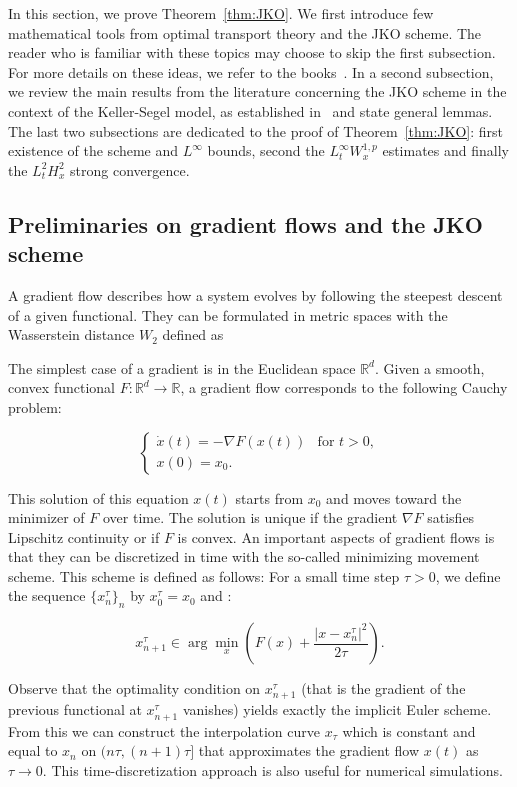 \documentclass[a4paper,twosided, 11pt]{article}
\theoremstyle{plain}
\theoremstyle{remark}
\numberwithin{equation}{section}
\begin{document}
In this section, we prove Theorem~\ref{thm:JKO}. We first introduce few mathematical tools from optimal transport theory and the JKO scheme. The reader who is familiar with these topics may choose to skip the first subsection. For more details on these ideas, we refer to the books~\cite{santambrogio2015optimal,villani2021topics,villani2009optimal,ambrosio2008gradient}. In a second subsection, we review the main results from the literature concerning the JKO scheme in the context of the Keller-Segel model, as established in~\cite{dimarino} and state general lemmas. The last two subsections are dedicated to the proof of Theorem~\ref{thm:JKO}: first existence of the scheme and $L^{\infty}$ bounds, second the $L^{\infty}_{t}W^{1,p}_{x}$ estimates and finally the $L^{2}_{t}H^{2}_{x}$ strong convergence.

\subsection{Preliminaries on gradient flows and the JKO scheme}

 A gradient flow describes how a system evolves by following the steepest descent of a given functional. They can be formulated in metric spaces with the Wasserstein distance $W_2$ defined as
 
 
 \iffalse The simplest case of a gradient is in the Euclidean space $\mathbb{R}^d$. Given a smooth, convex functional $F: \mathbb{R}^d \to \mathbb{R}$, a gradient flow corresponds to the following Cauchy problem:

\[
\begin{cases}
    \dot{x}(t) = -\nabla F(x(t)) & \text{for } t > 0, \\
    x(0) = x_0.
\end{cases}
\]

This solution of this equation $x(t)$ starts from $x_{0}$ and moves toward the minimizer of $F$ over time. The solution is unique if the gradient $\nabla F$ satisfies Lipschitz continuity or if $F$ is convex. An important aspects of gradient flows is that they can be discretized in time with the so-called minimizing movement scheme. This scheme is defined as follows:  For a small time step $\tau > 0$, we define the sequence $\{x_{n}^{\tau}\}_n$ by $x^{\tau}_{0}=x_0$ and :

\[
x_{n+1}^{\tau} \in \arg\min_x \left( F(x) + \frac{|x - x_n^{\tau}|^2}{2\tau} \right). 
\]

Observe that the optimality condition on $x_{n+1}^{\tau}$ (that is the gradient of the previous functional at $x_{n+1}^{\tau}$ vanishes) yields exactly the implicit Euler scheme. From this we can construct the interpolation curve $x_{\tau}$ which is constant and equal to $x_n$ on $(n\tau, (n+1)\tau]$ that approximates the gradient flow $x(t)$ as $\tau \to 0$. This time-discretization approach is also useful for numerical simulations. \\ 
\end{document}
